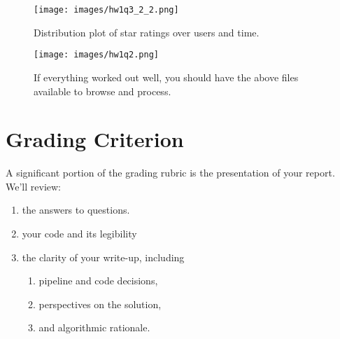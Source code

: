 \documentclass[paper=a4, fontsize=11pt]{scrartcl} %
\begin{document}
%
\begin{figure}
    \centering
    \texttt{[image: images/hw1q3\_2\_2.png]}
    \caption{Distribution plot of star ratings over users and time.}
    \label{fig:plot1}
\end{figure}

\begin{figure}
    \centering
    \texttt{[image: images/hw1q2.png]}
    \caption{If everything worked out well, you should have the above files available to browse and process.}
    \label{fig:data-files}
\end{figure}

\section{Grading Criterion}

A significant portion of the grading rubric is the presentation of your report. We'll review:

\begin{enumerate}
    \item the answers to questions.
    \item your code and its legibility
    \item the clarity of your write-up, including 
    \begin{enumerate}
      \item pipeline and code decisions, 
      \item perspectives on the solution, 
      \item and algorithmic rationale.
    \end{enumerate}
\end{enumerate}
\end{document}
